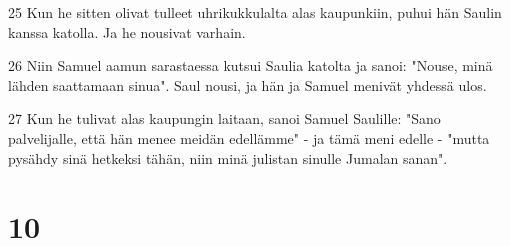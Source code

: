 \par 25 Kun he sitten olivat tulleet uhrikukkulalta alas kaupunkiin, puhui hän Saulin kanssa katolla. Ja he nousivat varhain.
\par 26 Niin Samuel aamun sarastaessa kutsui Saulia katolta ja sanoi: "Nouse, minä lähden saattamaan sinua". Saul nousi, ja hän ja Samuel menivät yhdessä ulos.
\par 27 Kun he tulivat alas kaupungin laitaan, sanoi Samuel Saulille: "Sano palvelijalle, että hän menee meidän edellämme" - ja tämä meni edelle - "mutta pysähdy sinä hetkeksi tähän, niin minä julistan sinulle Jumalan sanan".

\chapter{10}

